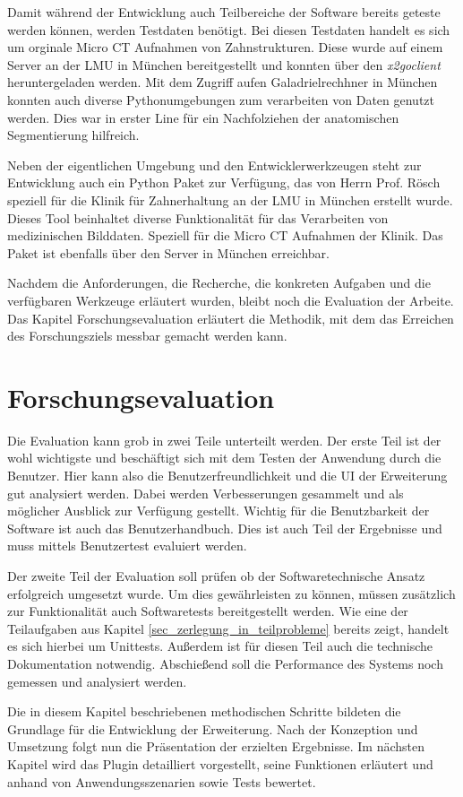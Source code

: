 Damit während der Entwicklung auch Teilbereiche der Software bereits geteste werden
können, werden Testdaten benötigt. Bei diesen Testdaten handelt es sich um orginale
Micro CT Aufnahmen von Zahnstrukturen. Diese wurde auf einem Server an der LMU
in München bereitgestellt und konnten über den \textit{x2goclient} heruntergeladen
werden. Mit dem Zugriff aufen Galadrielrechhner in München konnten auch diverse
Pythonumgebungen zum verarbeiten von Daten genutzt werden. Dies war in erster Line
für ein Nachfolziehen der anatomischen Segmentierung hilfreich.

Neben der eigentlichen Umgebung und den Entwicklerwerkzeugen steht zur Entwicklung
auch ein Python Paket zur Verfügung, das von Herrn Prof. Rösch speziell für die Klinik
für Zahnerhaltung an der LMU in München erstellt wurde. Dieses Tool beinhaltet
diverse Funktionalität für das Verarbeiten von medizinischen Bilddaten. Speziell
für die Micro CT Aufnahmen der Klinik. Das Paket ist ebenfalls über den Server
in München erreichbar.

Nachdem die Anforderungen, die Recherche, die konkreten Aufgaben und die
verfügbaren Werkzeuge erläutert wurden, bleibt noch die Evaluation der Arbeite.
Das Kapitel Forschungsevaluation erläutert die Methodik, mit dem das Erreichen des
Forschungsziels messbar gemacht werden kann.


\section{Forschungsevaluation}
Die Evaluation kann grob in zwei Teile unterteilt werden. Der erste Teil ist der
wohl wichtigste und beschäftigt sich mit dem Testen der Anwendung durch die Benutzer.
Hier kann also die Benutzerfreundlichkeit und die UI der Erweiterung gut
analysiert werden. Dabei werden Verbesserungen gesammelt und als möglicher Ausblick
zur Verfügung gestellt. Wichtig für die Benutzbarkeit der Software ist auch das
Benutzerhandbuch. Dies ist auch Teil der Ergebnisse und muss mittels Benutzertest
evaluiert werden.

Der zweite Teil der Evaluation soll prüfen ob der Softwaretechnische Ansatz erfolgreich
umgesetzt wurde. Um dies gewährleisten zu können, müssen zusätzlich zur Funktionalität
auch Softwaretests bereitgestellt werden. Wie eine der Teilaufgaben aus Kapitel
\ref{sec_zerlegung_in_teilprobleme} bereits zeigt, handelt es sich hierbei um Unittests.
Außerdem ist für diesen Teil auch die technische Dokumentation notwendig. Abschießend
soll die Performance des Systems noch gemessen und analysiert werden.

Die in diesem Kapitel beschriebenen methodischen Schritte bildeten die Grundlage
für die Entwicklung der Erweiterung. Nach der Konzeption und Umsetzung folgt nun
die Präsentation der erzielten Ergebnisse. Im nächsten Kapitel wird das Plugin detailliert
vorgestellt, seine Funktionen erläutert und anhand von Anwendungsszenarien sowie
Tests bewertet.
